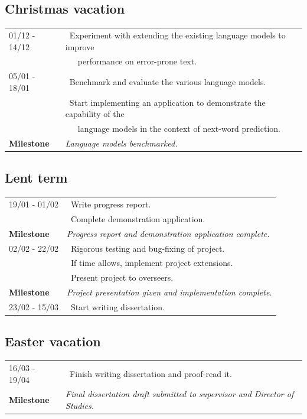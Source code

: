 \documentclass[a4paper, 12pt]{article}
\newcommand{\tbf}[1]{\textbf{#1}}
\newcommand{\tit}[1]{\textit{#1}}
\newcommand{\bpt}[0]{\textbullet~}
\begin{document}
\subsection*{Christmas vacation}
\begin{tabular}{l | l}
	01/12 - 14/12 & \bpt Experiment with extending the existing language models to improve \\
	&~~~performance on error-prone text. \\ \hline
	05/01 - 18/01 & \bpt Benchmark and evaluate the various language models. \\
	& \bpt Start implementing an application to demonstrate the capability of the \\
	&~~~language models in the context of next-word prediction. \\
	\tbf{Milestone} & \tit{Language models benchmarked.} \\
\end{tabular}

\subsection*{Lent term}
\begin{tabular}{l | l}
	19/01 - 01/02 & \bpt Write progress report. \\
	& \bpt Complete demonstration application. \\
	\tbf{Milestone} & \tit{Progress report and demonstration application complete.} \\ \hline
	02/02 - 22/02 & \bpt Rigorous testing and bug-fixing of project. \\
	& \bpt If time allows, implement project extensions. \\
	& \bpt Present project to overseers. \\
	\tbf{Milestone} & \tit{Project presentation given and implementation complete.} \\ \hline
	23/02 - 15/03 & \bpt Start writing dissertation. \\
\end{tabular}

\subsection*{Easter vacation}
\begin{tabular}{l | l}
	16/03 - 19/04 & \bpt Finish writing dissertation and proof-read it. \\
	\tbf{Milestone} & \tit{Final dissertation draft submitted to supervisor and Director of Studies.} \\
\end{tabular}
\end{document}
